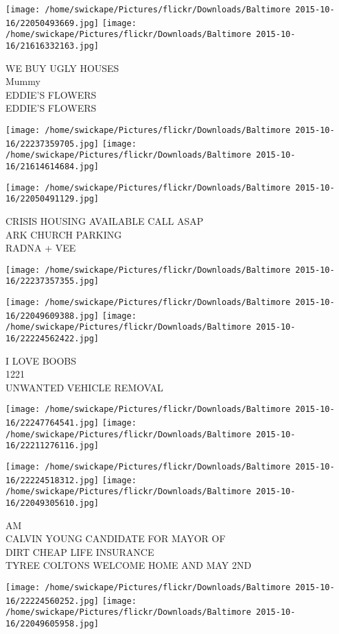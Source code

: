 \documentclass[10pt,letterpaper]{article}
\begin{document}
\texttt{[image: /home/swickape/Pictures/flickr/Downloads/Baltimore 2015-10-16/22050493669.jpg]}
\texttt{[image: /home/swickape/Pictures/flickr/Downloads/Baltimore 2015-10-16/21616332163.jpg]}

WE BUY UGLY HOUSES\\
Mummy\\
EDDIE'S FLOWERS\\
EDDIE'S FLOWERS
\pagebreak

\texttt{[image: /home/swickape/Pictures/flickr/Downloads/Baltimore 2015-10-16/22237359705.jpg]}
\texttt{[image: /home/swickape/Pictures/flickr/Downloads/Baltimore 2015-10-16/21614614684.jpg]}

\texttt{[image: /home/swickape/Pictures/flickr/Downloads/Baltimore 2015-10-16/22050491129.jpg]}

CRISIS HOUSING AVAILABLE CALL ASAP\\
ARK CHURCH PARKING\\
RADNA + VEE
\pagebreak

\texttt{[image: /home/swickape/Pictures/flickr/Downloads/Baltimore 2015-10-16/22237357355.jpg]}

\vspace{0.25in}
\texttt{[image: /home/swickape/Pictures/flickr/Downloads/Baltimore 2015-10-16/22049609388.jpg]}
\texttt{[image: /home/swickape/Pictures/flickr/Downloads/Baltimore 2015-10-16/22224562422.jpg]}

I LOVE BOOBS\\
1221\\
UNWANTED VEHICLE REMOVAL
\pagebreak

\texttt{[image: /home/swickape/Pictures/flickr/Downloads/Baltimore 2015-10-16/22247764541.jpg]}
\texttt{[image: /home/swickape/Pictures/flickr/Downloads/Baltimore 2015-10-16/22211276116.jpg]}

\texttt{[image: /home/swickape/Pictures/flickr/Downloads/Baltimore 2015-10-16/22224518312.jpg]}
\texttt{[image: /home/swickape/Pictures/flickr/Downloads/Baltimore 2015-10-16/22049305610.jpg]}

AM\\
CALVIN YOUNG CANDIDATE FOR MAYOR OF\\
DIRT CHEAP LIFE INSURANCE\\
TYREE COLTONS WELCOME HOME AND MAY 2ND
\pagebreak

\texttt{[image: /home/swickape/Pictures/flickr/Downloads/Baltimore 2015-10-16/22224560252.jpg]}
\texttt{[image: /home/swickape/Pictures/flickr/Downloads/Baltimore 2015-10-16/22049605958.jpg]}
\end{document}

